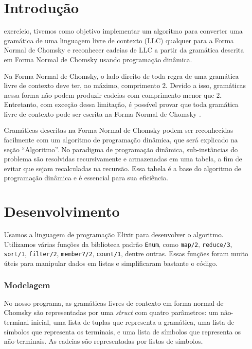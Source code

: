 \documentclass[journal,transmag]{IEEEtran}
\begin{document}
\section{Introdução}
% 
% 
% 
% 
 exercício, tivemos como objetivo implementar um algoritmo
para converter uma gramática de uma linguagem livre de contexto (LLC) qualquer
para a Forma Normal de Chomsky e reconhecer cadeias de LLC a partir da gramática
descrita em Forma Normal de Chomsky usando programação dinâmica.

Na Forma Normal de Chomsky, o lado direito de toda regra de uma gramática livre
de contexto deve ter, no máximo, comprimento 2. Devido a isso,
gramáticas nessa forma não podem produzir cadeias com comprimento menor que 2.
Entretanto, com exceção dessa limitação, é possível provar que toda gramática
livre de contexto pode ser escrita na Forma Normal de Chomsky \cite{livro}.

Gramáticas descritas na Forma Normal de Chomsky podem ser reconhecidas
facilmente com um algoritmo de programação dinâmica, que será explicado na seção
``Algoritmo''. No paradigma de programação dinâmica, sub-instâncias do problema
são resolvidas recursivamente e armazenadas em uma tabela, a fim de evitar que 
sejam recalculadas na recursão. Essa tabela é a base do algoritmo de programação
dinâmica e é essencial para sua eficiência.

\section{Desenvolvimento}
Usamos a linguagem de programação Elixir para desenvolver o algoritmo. 
Utilizamos várias funções da biblioteca padrão \texttt{Enum}, como
\texttt{map/2}, \texttt{reduce/3}, \texttt{sort/1}, \texttt{filter/2},
\texttt{member?/2}, \texttt{count/1}, dentre outras. Essas funções foram muito
úteis para manipular dados em listas e simplificaram bastante o código.
\subsubsection{Modelagem}
No nosso programa, as gramáticas livres de contexto em forma normal de Chomsky
são representadas por uma \textit{struct} com quatro parâmetros: um não-terminal inicial, uma lista de 
tuplas que representa a gramática, uma lista de símbolos que representa os
terminais, e uma lista de símbolos que representa os não-terminais. As cadeias
são representadas por listas de símbolos.
\end{document}

